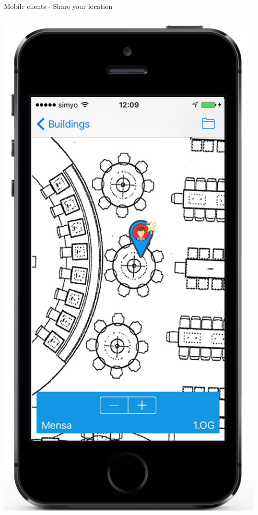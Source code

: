 \documentclass[11pt]{beamer}
\newcommand{\todo}[1]{\raisebox{0pt}{\parbox{0pt}{\begin{large}\colorbox{red}{todo: #1}\end{large} \hspace*{0.05cm}}}}
\begin{document}
\begin{frame}{Mobile clients - Share your location}

  \begin{columns}[T]
	\begin{column}{.4\textwidth}
	\includegraphics[scale=0.27]{mappinpointb}
	\end{column}


\end{columns}
\end{frame}
\end{document}
